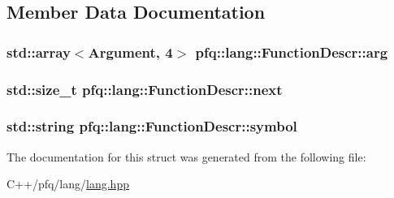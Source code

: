 \subsection{Member Data Documentation}
\hypertarget{structpfq_1_1lang_1_1FunctionDescr_a2be2814d79d9836cd8e4adbc4dc4e1ca}{
\subsubsection[{arg}]{\setlength{\rightskip}{0pt plus 5cm}std\+::array$<${\bf Argument}, 4$>$ pfq\+::lang\+::\+Function\+Descr\+::arg}}\label{structpfq_1_1lang_1_1FunctionDescr_a2be2814d79d9836cd8e4adbc4dc4e1ca}
\hypertarget{structpfq_1_1lang_1_1FunctionDescr_aed683dff23bcead8e4a16ac21ef8ae68}{
\subsubsection[{next}]{\setlength{\rightskip}{0pt plus 5cm}std\+::size\+\_\+t pfq\+::lang\+::\+Function\+Descr\+::next}}\label{structpfq_1_1lang_1_1FunctionDescr_aed683dff23bcead8e4a16ac21ef8ae68}
\hypertarget{structpfq_1_1lang_1_1FunctionDescr_a21f51c65f55dddd54de1171d8914c030}{
\subsubsection[{symbol}]{\setlength{\rightskip}{0pt plus 5cm}std\+::string pfq\+::lang\+::\+Function\+Descr\+::symbol}}\label{structpfq_1_1lang_1_1FunctionDescr_a21f51c65f55dddd54de1171d8914c030}


The documentation for this struct was generated from the following file\+:\begin{DoxyCompactItemize}
\item 
C++/pfq/lang/\hyperlink{lang_8hpp}{lang.\+hpp}\end{DoxyCompactItemize}
